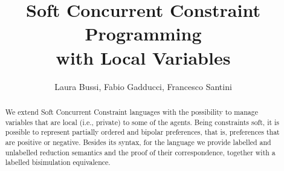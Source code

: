 \documentclass{llncs}
\begin{document}
\title{Soft Concurrent Constraint Programming\\ with Local Variables
}


\author{Laura Bussi, Fabio Gadducci, 
Francesco Santini
} 
	

\maketitle

\begin{abstract}
We extend Soft Concurrent Constraint languages with the possibility to manage variables that are local (i.e., private) to some of the agents. Being  constraints soft,  it is possible to  represent partially ordered and bipolar preferences, that is, preferences that are positive or negative. 
Besides its syntax, for the language we provide labelled and unlabelled reduction semantics and the proof of their correspondence, together with a labelled bisimulation equivalence.
\end{abstract}


\end{document}
